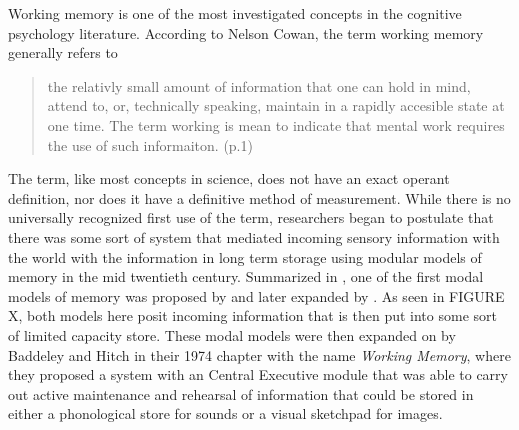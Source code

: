 \documentclass[]{book}
\theoremstyle{definition}
\theoremstyle{definition}
\theoremstyle{definition}
\theoremstyle{remark}
\begin{document}
Working memory is one of the most investigated concepts in the cognitive
psychology literature. According to Nelson Cowan, the term working
memory generally refers to

\begin{quote}
the relativly small amount of information that one can hold in mind,
attend to, or, technically speaking, maintain in a rapidly accesible
state at one time. The term working is mean to indicate that mental work
requires the use of such informaiton. (p.1)
\citep{cowanWorkingMemoryCapacity2005}
\end{quote}

The term, like most concepts in science, does not have an exact operant
definition, nor does it have a definitive method of measurement. While
there is no universally recognized first use of the term, researchers
began to postulate that there was some sort of system that mediated
incoming sensory information with the world with the information in long
term storage using modular models of memory in the mid twentieth
century. Summarized in \citep{cowanWorkingMemoryCapacity2005}, one of
the first modal models of memory was proposed by
\citep{broadbentPerceptionCommunication1958} and later expanded by
\citep{atkinsonHUMANMEMORYPROPOSED1968}. As seen in FIGURE X, both
models here posit incoming information that is then put into some sort
of limited capacity store. These modal models were then expanded on by
Baddeley and Hitch \citep{baddeleyWorkingMemory1974} in their 1974
chapter with the name \emph{Working Memory}, where they proposed a
system with an Central Executive module that was able to carry out
active maintenance and rehearsal of information that could be stored in
either a phonological store for sounds or a visual sketchpad for images.
\end{document}
